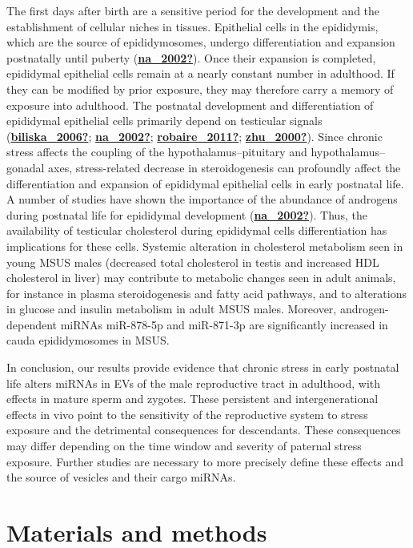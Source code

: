 \documentclass[12pt,twoside]{reedthesis}
\begin{document}
The first days after birth are a sensitive period for the development
and the establishment of cellular niches in tissues. Epithelial cells in
the epididymis, which are the source of epididymosomes, undergo
differentiation and expansion postnatally until puberty (\protect\hyperlink{ref-na_2002}{\textbf{na\_2002?}}). Once
their expansion is completed, epididymal epithelial cells remain at a
nearly constant number in adulthood. If they can be modified by prior
exposure, they may therefore carry a memory of exposure into adulthood.
The postnatal development and differentiation of epididymal epithelial
cells primarily depend on testicular signals (\protect\hyperlink{ref-biliska_2006}{\textbf{biliska\_2006?}}; \protect\hyperlink{ref-na_2002}{\textbf{na\_2002?}}; \protect\hyperlink{ref-robaire_2011}{\textbf{robaire\_2011?}}; \protect\hyperlink{ref-zhu_2000}{\textbf{zhu\_2000?}}). Since chronic stress affects the coupling of
the hypothalamus--pituitary and hypothalamus--gonadal axes,
stress-related decrease in steroidogenesis can profoundly affect the
differentiation and expansion of epididymal epithelial cells in early
postnatal life. A number of studies have shown the importance of the
abundance of androgens during postnatal life for epididymal development
(\protect\hyperlink{ref-na_2002}{\textbf{na\_2002?}}). Thus, the availability of testicular cholesterol during
epididymal cells differentiation has implications for these cells.
Systemic alteration in cholesterol metabolism seen in young MSUS males
(decreased total cholesterol in testis and increased HDL cholesterol in
liver) may contribute to metabolic changes seen in adult animals, for
instance in plasma steroidogenesis and fatty acid pathways, and to
alterations in glucose and insulin metabolism in adult MSUS males.
Moreover, androgen-dependent miRNAs miR-878-5p and miR-871-3p are
significantly increased in cauda epididymosomes in MSUS.

In conclusion, our results provide evidence that chronic stress in early
postnatal life alters miRNAs in EVs of the male reproductive tract in
adulthood, with effects in mature sperm and zygotes. These persistent
and intergenerational effects in vivo point to the sensitivity of the
reproductive system to stress exposure and the detrimental consequences
for descendants. These consequences may differ depending on the time
window and severity of paternal stress exposure. Further studies are
necessary to more precisely define these effects and the source of
vesicles and their cargo miRNAs.

\hypertarget{materials-and-methods}{%
\section{Materials and methods}\label{materials-and-methods}}
\end{document}
